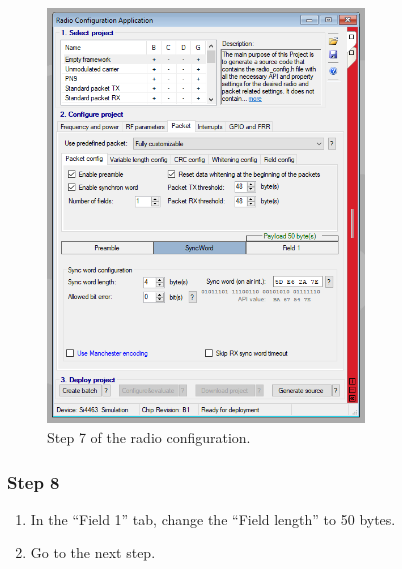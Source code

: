 \begin{figure}[!h]
	\begin{center}
		\includegraphics[width=0.75\textwidth]{figures/wds-tutorial/wds-tutorial-7.png}
		\caption{Step 7 of the radio configuration.}
		\label{fig:wds-tutorial-step-7}
	\end{center}
\end{figure}

\subsubsection{Step 8}

\begin{enumerate}
    \item In the ``Field 1'' tab, change the ``Field length'' to 50 bytes.
    \item Go to the next step.
\end{enumerate}

